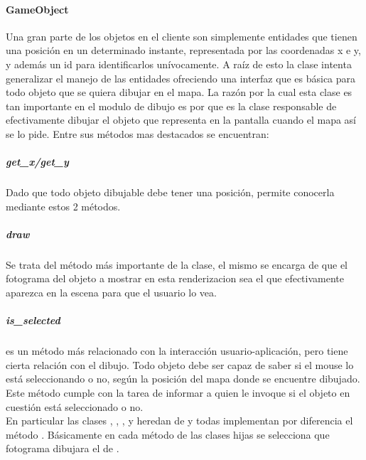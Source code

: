         \paragraph{GameObject}
            Una gran parte de los objetos en el cliente son simplemente
            entidades que tienen una posición en un determinado instante,
            representada por las coordenadas x e y, y además un id para
            identificarlos unívocamente. A raíz de esto la clase
             intenta generalizar el manejo de las entidades
            ofreciendo una interfaz que es básica para todo objeto que se quiera
            dibujar en el mapa. La razón por la cual esta clase es tan importante
            en el modulo de dibujo es por que es la clase responsable de
            efectivamente dibujar el objeto que representa en la pantalla cuando
            el mapa así se lo pide. Entre sus métodos mas destacados se
            encuentran:
            \def\path{client/GameObject.jpg}
            \def\scale{.6}
            \def\text{GameObject}
            
            \subparagraph{get\_x/get\_y}
                Dado que todo objeto dibujable debe tener una posición,
                 permite conocerla mediante estos 2 métodos.
            \subparagraph{draw}
                Se trata del método más importante de la clase, el mismo se
                encarga de que el fotograma del objeto a mostrar en esta
                renderizacion sea el que efectivamente aparezca en la escena
                para que el usuario lo vea.
            \subparagraph{is\_selected}
                es un método más relacionado con la interacción usuario-aplicación,
                pero tiene cierta relación con el dibujo. Todo objeto debe ser
                capaz de saber si el mouse lo está seleccionando o no, según la
                posición del mapa donde se encuentre dibujado. Este método cumple
                con la tarea de informar a quien le invoque si el objeto en cuestión
                está seleccionado o no.\\
                En particular las clases , ,
                ,  y 
                heredan de  y todas implementan por diferencia el
                método . Básicamente en cada método  de las
                clases hijas se selecciona que fotograma dibujara el  de
                .
